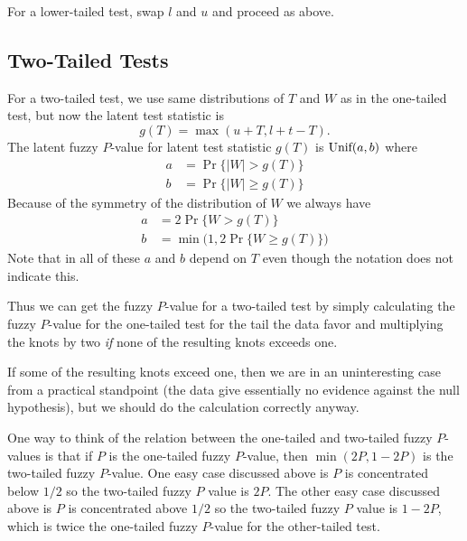 \documentclass{article}
\newcommand{\UniformDis}{\text{\upshape Unif}}
\begin{document}
For a lower-tailed test, swap $l$ and $u$ and proceed as above.

\subsection{Two-Tailed Tests}

For a two-tailed test, we use same distributions of $T$ and $W$ as in
the one-tailed test, but now the latent test statistic is
$$
   g(T) = \max(u + T, l + t - T).
$$
The latent fuzzy $P$-value
for latent test statistic $g(T)$ is $\UniformDis(a, b)$ where
\begin{align*}
   a & = \Pr\{ \lvert W \rvert > g(T) \}
   \\
   b & = \Pr\{ \lvert W \rvert \ge g(T) \}
\end{align*}
Because of the symmetry of the distribution of $W$ we always have
\begin{align*}
   a & = 2 \Pr\{ W > g(T) \}
   \\
   b & = \min\bigl( 1, 2 \Pr\{ W \ge g(T) \} \bigr)
\end{align*}
Note that in all of these $a$ and $b$ depend on $T$ even though the notation
does not indicate this.

Thus we can get the fuzzy $P$-value for a two-tailed test by simply
calculating the fuzzy $P$-value for the one-tailed test for the tail
the data favor and multiplying the knots by two \emph{if} none of the
resulting knots exceeds one.

If some of the resulting knots exceed one, then we are in an uninteresting
case from a practical standpoint (the data give essentially no evidence
against the null hypothesis), but we should do the calculation correctly
anyway.

One way to think of the relation between the one-tailed and two-tailed
fuzzy $P$-values is that if $P$ is the one-tailed fuzzy $P$-value,
then $\min(2 P, 1 - 2 P)$ is the two-tailed fuzzy $P$-value.
One easy case discussed above is $P$ is concentrated below $1 / 2$
so the two-tailed fuzzy $P$ value is $2 P$.
The other easy case discussed above is $P$ is concentrated above $1 / 2$
so the two-tailed fuzzy $P$ value is $1 - 2 P$, which is twice the one-tailed
fuzzy $P$-value for the other-tailed test.
\end{document}
